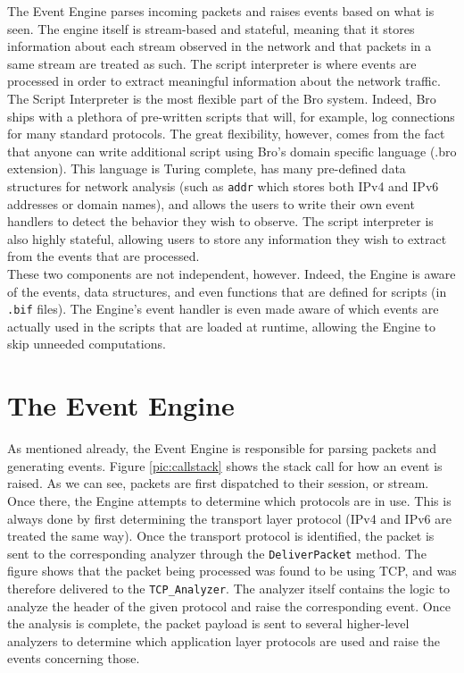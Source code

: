 The Event Engine parses incoming packets and raises events based on what is seen. The engine itself is stream-based and stateful, meaning that it stores information about each stream observed in the network and that packets in a same stream are treated as such. The script interpreter is where events are processed in order to extract meaningful information about the network traffic.\\

The Script Interpreter is the most flexible part of the Bro system. Indeed, Bro ships with a plethora of pre-written scripts that will, for example, log connections for many standard protocols. The great flexibility, however, comes from the fact that anyone can write additional script using Bro's domain specific language (.bro extension). This language is Turing complete, has many pre-defined data structures for network analysis (such as \texttt{addr} which stores both IPv4 and IPv6 addresses or domain names), and allows the users to write their own event handlers to detect the behavior they wish to observe. The script interpreter is also highly stateful, allowing users to store any information they wish to extract from the events that are processed.\\

These two components are not independent, however. Indeed, the Engine is aware of the events, data structures, and even functions that are defined  for scripts (in \texttt{.bif} files). The Engine's event handler is even made aware of which events are actually used in the scripts that are loaded at runtime, allowing the Engine to skip unneeded computations.

\section{The Event Engine}
As mentioned already, the Event Engine is responsible for parsing packets and generating events. Figure \ref{pic:callstack} shows the stack call for how an event is raised. As we can see, packets are first dispatched to their session, or stream. Once there, the Engine attempts to determine which protocols are in use. This is always done by first determining the transport layer protocol (IPv4 and IPv6 are treated the same way). Once the transport protocol is identified, the packet is sent to the corresponding analyzer through the \texttt{DeliverPacket} method. The figure shows that the packet being processed was found to be using TCP, and was therefore delivered to the \texttt{TCP\_Analyzer}. The analyzer itself contains the logic to analyze the header of the given protocol and raise the corresponding event. Once the analysis is complete, the packet payload is sent to several higher-level analyzers to determine which application layer protocols are used and raise the events concerning those. \\

